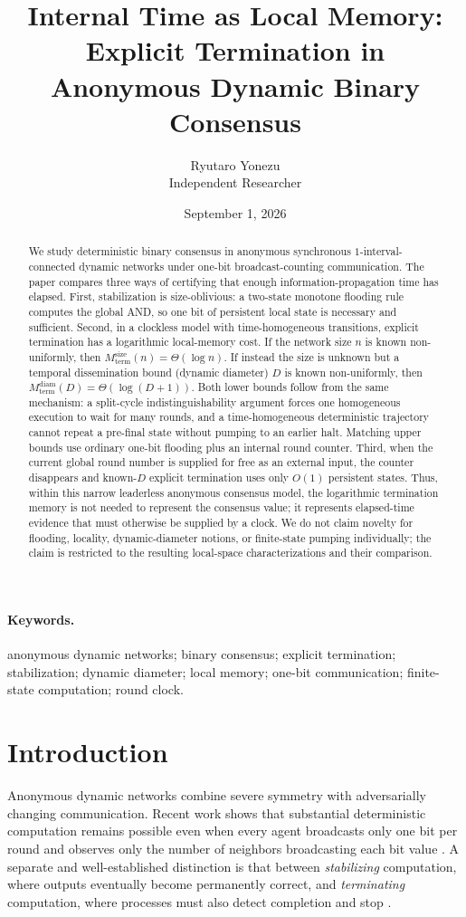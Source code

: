 \documentclass[11pt]{article}
\title{\textbf{Internal Time as Local Memory:\\Explicit Termination in Anonymous Dynamic Binary Consensus}}
\author{Ryutaro Yonezu\\\small Independent Researcher}
\date{September 1, 2026}
\theoremstyle{remark}
\begin{document}
\maketitle

\begin{abstract}
We study deterministic binary consensus in anonymous synchronous $1$-interval-connected dynamic networks under one-bit broadcast-counting communication. The paper compares three ways of certifying that enough information-propagation time has elapsed. First, stabilization is size-oblivious: a two-state monotone flooding rule computes the global AND, so one bit of persistent local state is necessary and sufficient. Second, in a clockless model with time-homogeneous transitions, explicit termination has a logarithmic local-memory cost. If the network size $n$ is known non-uniformly, then $M_{\mathrm{term}}^{\mathrm{size}}(n)=\Theta(\log n)$. If instead the size is unknown but a temporal dissemination bound (dynamic diameter) $D$ is known non-uniformly, then $M_{\mathrm{term}}^{\mathrm{diam}}(D)=\Theta(\log(D+1))$. Both lower bounds follow from the same mechanism: a split-cycle indistinguishability argument forces one homogeneous execution to wait for many rounds, and a time-homogeneous deterministic trajectory cannot repeat a pre-final state without pumping to an earlier halt. Matching upper bounds use ordinary one-bit flooding plus an internal round counter. Third, when the current global round number is supplied for free as an external input, the counter disappears and known-$D$ explicit termination uses only $O(1)$ persistent states. Thus, within this narrow leaderless anonymous consensus model, the logarithmic termination memory is not needed to represent the consensus value; it represents elapsed-time evidence that must otherwise be supplied by a clock. We do not claim novelty for flooding, locality, dynamic-diameter notions, or finite-state pumping individually; the claim is restricted to the resulting local-space characterizations and their comparison.
\end{abstract}

\paragraph{Keywords.} anonymous dynamic networks; binary consensus; explicit termination; stabilization; dynamic diameter; local memory; one-bit communication; finite-state computation; round clock.

\section{Introduction}
Anonymous dynamic networks combine severe symmetry with adversarially changing communication. Recent work shows that substantial deterministic computation remains possible even when every agent broadcasts only one bit per round and observes only the number of neighbors broadcasting each bit value \cite{blanc2026onebit}. A separate and well-established distinction is that between \emph{stabilizing} computation, where outputs eventually become permanently correct, and \emph{terminating} computation, where processes must also detect completion and stop \cite{schmid2026topological,diluna2026finite}.
\end{document}
